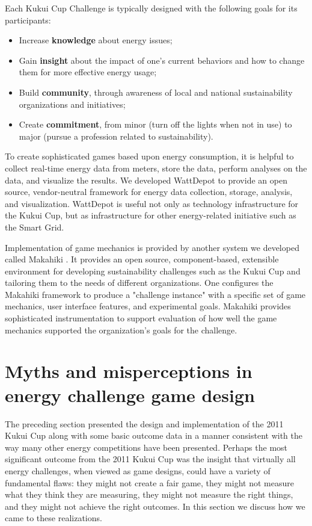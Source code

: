 \documentclass[jou]{apa} %
\begin{document}
Each Kukui Cup Challenge is typically designed with the following goals for its participants:
\begin{itemize}
\item Increase {\bf knowledge} about energy issues;
\item Gain {\bf insight} about the impact of one's current behaviors and how to change
  them for more effective energy usage;
\item Build {\bf community}, through awareness of local and national sustainability organizations and initiatives;
\item Create {\bf commitment}, from minor (turn off the lights when not in use) to major (pursue a profession related to sustainability).
\end{itemize}

To create sophisticated games based upon energy consumption, it is helpful to
collect real-time energy data from meters, store the data, perform analyses on the data, and
visualize the results. We developed WattDepot \cite{csdl2-10-05} to provide an open source, vendor-neutral
framework for energy data collection, storage, analysis, and visualization.  WattDepot is
useful not only as technology infrastructure for the Kukui Cup, but as infrastructure for
other energy-related initiative such as the Smart Grid.

Implementation of game mechanics is provided by another system we developed called
Makahiki \cite{csdl2-11-07}.  It provides an open source, component-based, extensible environment for
developing sustainability challenges such as the Kukui Cup and tailoring them to the needs
of different organizations.  One configures the Makahiki framework to produce a "challenge
instance" with a specific set of game mechanics, user interface features, and experimental
goals.  Makahiki provides sophisticated instrumentation to support evaluation of how well
the game mechanics supported the organization's goals for the challenge. 




\section{Myths and misperceptions in energy challenge game design}

The preceding section presented the design and implementation of the 2011 Kukui Cup along
with some basic outcome data in a manner consistent with the way many other energy
competitions have been presented.  Perhaps the most significant outcome from the 2011
Kukui Cup was the insight that virtually all energy challenges, when viewed as game
designs, could have a variety of fundamental flaws: they might not create a fair game,
they might not measure what they think they are measuring, they might not measure the
right things, and they might not achieve the right outcomes.  In this section we discuss
how we came to these realizations.
\end{document}
